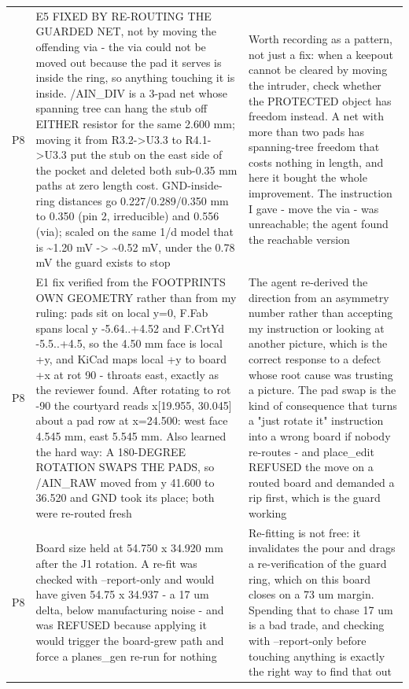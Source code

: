 \documentclass[11pt,a4paper]{article}
\begin{document}
{\begin{longtable}{lp{5.2cm}p{7.2cm}}
P8 & E5 FIXED BY RE-ROUTING THE GUARDED NET, not by moving the offending via - the via could not be moved out because the pad it serves is inside the ring, so anything touching it is inside. /AIN\_DIV is a 3-pad net whose spanning tree can hang the stub off EITHER resistor for the same 2.600 mm; moving it from R3.2-\textgreater{}U3.3 to R4.1-\textgreater{}U3.3 put the stub on the east side of the pocket and deleted both sub-0.35 mm paths at zero length cost. GND-inside-ring distances go 0.227/0.289/0.350 mm to 0.350 (pin 2, irreducible) and 0.556 (via); scaled on the same 1/d model that is \textasciitilde{}1.20 mV -\textgreater{} \textasciitilde{}0.52 mV, under the 0.78 mV the guard exists to stop & Worth recording as a pattern, not just a fix: when a keepout cannot be cleared by moving the intruder, check whether the PROTECTED object has freedom instead. A net with more than two pads has spanning-tree freedom that costs nothing in length, and here it bought the whole improvement. The instruction I gave - move the via - was unreachable; the agent found the reachable version \\
P8 & E1 fix verified from the FOOTPRINTS OWN GEOMETRY rather than from my ruling: pads sit on local y=0, F.Fab spans local y -5.64..+4.52 and F.CrtYd -5.5..+4.5, so the 4.50 mm face is local +y, and KiCad maps local +y to board +x at rot 90 - throats east, exactly as the reviewer found. After rotating to rot -90 the courtyard reads x{[}19.955, 30.045{]} about a pad row at x=24.500: west face 4.545 mm, east 5.545 mm. Also learned the hard way: A 180-DEGREE ROTATION SWAPS THE PADS, so /AIN\_RAW moved from y 41.600 to 36.520 and GND took its place; both were re-routed fresh & The agent re-derived the direction from an asymmetry number rather than accepting my instruction or looking at another picture, which is the correct response to a defect whose root cause was trusting a picture. The pad swap is the kind of consequence that turns a "just rotate it" instruction into a wrong board if nobody re-routes - and place\_edit REFUSED the move on a routed board and demanded a rip first, which is the guard working \\
P8 & Board size held at 54.750 x 34.920 mm after the J1 rotation. A re-fit was checked with --report-only and would have given 54.75 x 34.937 - a 17 um delta, below manufacturing noise - and was REFUSED because applying it would trigger the board-grew path and force a planes\_gen re-run for nothing & Re-fitting is not free: it invalidates the pour and drags a re-verification of the guard ring, which on this board closes on a 73 um margin. Spending that to chase 17 um is a bad trade, and checking with --report-only before touching anything is exactly the right way to find that out \\

\end{longtable}}
\end{document}
